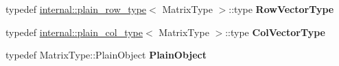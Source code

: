\begin{DoxyCompactItemize}
\item 
\mbox{\label{group___q_r___module_a2c68675b694ac5feefbe78c6913eaa13}} 
typedef \hyperlink{struct_eigen_1_1internal_1_1plain__row__type}{internal\+::plain\+\_\+row\+\_\+type}$<$ Matrix\+Type $>$\+::type {\bfseries Row\+Vector\+Type}
\item 
\mbox{\label{group___q_r___module_a5abef403dc2f41f954dff3a52f597da4}} 
typedef \hyperlink{struct_eigen_1_1internal_1_1plain__col__type}{internal\+::plain\+\_\+col\+\_\+type}$<$ Matrix\+Type $>$\+::type {\bfseries Col\+Vector\+Type}
\item 
\mbox{\label{group___q_r___module_ac665e21d7152407fe05cd60371e5ef17}} 
typedef Matrix\+Type\+::\+Plain\+Object {\bfseries Plain\+Object}
\end{DoxyCompactItemize}
